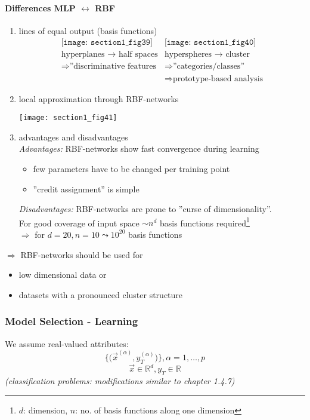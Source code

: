 \paragraph{Differences MLP $\leftrightarrow$ RBF}
\begin{enumerate}[(1)]
\item lines of equal output (basis functions)
\[ \begin{array}{ll}
	\texttt{[image: section1\_fig39]}
	& \texttt{[image: section1\_fig40]} \\
	\text{hyperplanes } \rightarrow \text{ half spaces} 
	& \text{hyperspheres } \rightarrow \text{ cluster} \\
	\Rightarrow \text{''discriminative features} 
	& \Rightarrow \text{''categories/classes''} \\
	& \Rightarrow \text{prototype-based analysis}
\end{array} \]
\item local approximation through RBF-networks
\begin{center}\texttt{[image: section1\_fig41]}\end{center}
\item advantages and disadvantages
\\
\emph{Advantages:} RBF-networks show fast convergence during learning
\begin{itemize}
	\item few parameters have to be changed per training point
	\item ''credit assignment'' is simple
\end{itemize}
\emph{Disadvantages:} RBF-networks are prone to ''curse of dimensionality''.\\
For good coverage of input space $\sim n^d$ basis functions required\footnote{$d$: dimension, $n$: no. of basis functions along one dimension}\\
$\Rightarrow$ for $d = 20, n = 10 \leadsto 10^{20}$ basis functions
\end{enumerate}
$\Rightarrow$ RBF-networks should be used for
\begin{itemize}
	\item low dimensional data or
	\item datasets with a pronounced cluster structure
\end{itemize}


\subsubsection{Model Selection - Learning} \label{sec:model-select-learn}
We assume real-valued attributes:
\[ \Big\{ \Big( \vec{x}^{(\alpha)}, y_T^{(\alpha)} \Big) \Big\},
	\alpha = 1, \ldots, p \]
\[ \vec{x} \in \mathbb{R}^d, y_T \in \mathbb{R} \]
{\it (classification problems: modifications similar to chapter 1.4.7)}\\

